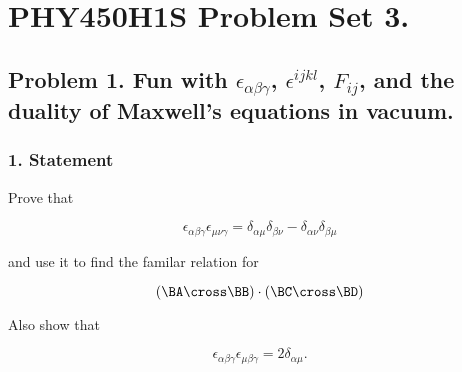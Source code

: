 %


\author{Peeter Joot}

\chapter{PHY450H1S Problem Set 3.}
\label{chap:relElectroDynProblemSet3}
\date{Feb 15, 2011}

\beginArtNoToc
%

\section{Problem 1.  Fun with $\epsilon_{\alpha\beta\gamma}$, $\epsilon^{ijkl}$, $F_{ij}$, and the duality of Maxwell's equations in vacuum.}

\subsection{1. Statement}

Prove that

\begin{equation}\label{eqn:relElectroDynProblemSet3:n}
\epsilon_{\alpha \beta \gamma}
\epsilon_{\mu \nu \gamma}
=
\delta_{\alpha\mu} \delta_{\beta\nu}
-\delta_{\alpha\nu} \delta_{\beta\mu}
\end{equation}

and use it to find the familar relation for

\begin{equation}\label{eqn:relElectroDynProblemSet3:n}
(\BA \cross \BB) \cdot (\BC \cross \BD)
\end{equation}

Also show that

\begin{equation}\label{eqn:relElectroDynProblemSet3:n}
\epsilon_{\alpha \beta \gamma}
\epsilon_{\mu \beta \gamma}
=
2 \delta_{\alpha\mu}.
\end{equation}

